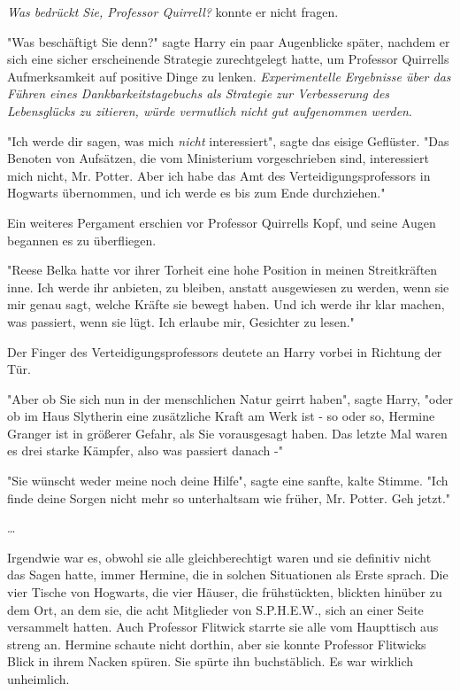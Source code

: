 {\emph{Was bedrückt Sie, Professor Quirrell?} konnte er nicht fragen.

"Was beschäftigt Sie denn?" sagte Harry ein paar Augenblicke später, nachdem er sich eine sicher erscheinende Strategie zurechtgelegt hatte, um Professor Quirrells Aufmerksamkeit auf positive Dinge zu lenken. \emph{Experimentelle Ergebnisse über das Führen eines Dankbarkeitstagebuchs als Strategie zur Verbesserung des Lebensglücks zu zitieren, würde vermutlich nicht gut aufgenommen werden}.

"Ich werde dir sagen, was mich \emph{nicht} interessiert", sagte das eisige Geflüster. "Das Benoten von Aufsätzen, die vom Ministerium vorgeschrieben sind, interessiert mich nicht, Mr. Potter. Aber ich habe das Amt des Verteidigungsprofessors in Hogwarts übernommen, und ich werde es bis zum Ende durchziehen."

Ein weiteres Pergament erschien vor Professor Quirrells Kopf, und seine Augen begannen es zu überfliegen.

"Reese Belka hatte vor ihrer Torheit eine hohe Position in meinen Streitkräften inne. Ich werde ihr anbieten, zu bleiben, anstatt ausgewiesen zu werden, wenn sie mir genau sagt, welche Kräfte sie bewegt haben. Und ich werde ihr klar machen, was passiert, wenn sie lügt. Ich erlaube mir, Gesichter zu lesen."

Der Finger des Verteidigungsprofessors deutete an Harry vorbei in Richtung der Tür.

"Aber ob Sie sich nun in der menschlichen Natur geirrt haben", sagte Harry, "oder ob im Haus Slytherin eine zusätzliche Kraft am Werk ist - so oder so, Hermine Granger ist in größerer Gefahr, als Sie vorausgesagt haben. Das letzte Mal waren es drei starke Kämpfer, also was passiert danach -"

"Sie wünscht weder meine noch deine Hilfe", sagte eine sanfte, kalte Stimme. "Ich finde deine Sorgen nicht mehr so unterhaltsam wie früher, Mr. Potter. Geh jetzt."

…

Irgendwie war es, obwohl sie alle gleichberechtigt waren und sie definitiv nicht das Sagen hatte, immer Hermine, die in solchen Situationen als Erste sprach. Die vier Tische von Hogwarts, die vier Häuser, die frühstückten, blickten hinüber zu dem Ort, an dem sie, die acht Mitglieder von S.P.H.E.W., sich an einer Seite versammelt hatten. Auch Professor Flitwick starrte sie alle vom Haupttisch aus streng an. Hermine schaute nicht dorthin, aber sie konnte Professor Flitwicks Blick in ihrem Nacken spüren. Sie spürte ihn buchstäblich. Es war wirklich unheimlich.

}
